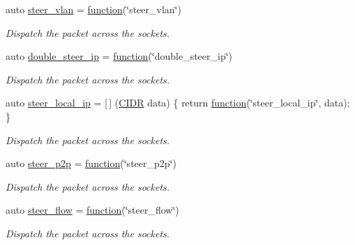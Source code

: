 \begin{DoxyCompactItemize}
auto \hyperlink{namespacepfq_1_1lang_1_1anonymous__namespace_02default_8hpp_03_a2c6a8ad5a3ae8b60a6a3d18a510f22ac}{steer\+\_\+vlan} = \hyperlink{namespacepfq_1_1lang_a1a4638059d700ae08d0ca63886ff2bb3}{function}(\char`\"{}steer\+\_\+vlan\char`\"{})
\begin{DoxyCompactList}\small\item\em Dispatch the packet across the sockets. \end{DoxyCompactList}\item 
auto \hyperlink{namespacepfq_1_1lang_1_1anonymous__namespace_02default_8hpp_03_aaea5fb1d1914a1b01e52d8634b095eb6}{double\+\_\+steer\+\_\+ip} = \hyperlink{namespacepfq_1_1lang_a1a4638059d700ae08d0ca63886ff2bb3}{function}(\char`\"{}double\+\_\+steer\+\_\+ip\char`\"{})
\begin{DoxyCompactList}\small\item\em Dispatch the packet across the sockets. \end{DoxyCompactList}\item 
auto \hyperlink{namespacepfq_1_1lang_1_1anonymous__namespace_02default_8hpp_03_a4f2ef4dd2da0408a456f9b29b752686a}{steer\+\_\+local\+\_\+ip} = \mbox{[}$\,$\mbox{]} (\hyperlink{structpfq_1_1lang_1_1CIDR}{C\+I\+DR} data) \{ return \hyperlink{namespacepfq_1_1lang_a1a4638059d700ae08d0ca63886ff2bb3}{function}(\char`\"{}steer\+\_\+local\+\_\+ip\char`\"{}, data); \}
\begin{DoxyCompactList}\small\item\em Dispatch the packet across the sockets. \end{DoxyCompactList}\item 
auto \hyperlink{namespacepfq_1_1lang_1_1anonymous__namespace_02default_8hpp_03_a93e5f91a2b955269de017225cf62e711}{steer\+\_\+p2p} = \hyperlink{namespacepfq_1_1lang_a1a4638059d700ae08d0ca63886ff2bb3}{function}(\char`\"{}steer\+\_\+p2p\char`\"{})
\begin{DoxyCompactList}\small\item\em Dispatch the packet across the sockets. \end{DoxyCompactList}\item 
auto \hyperlink{namespacepfq_1_1lang_1_1anonymous__namespace_02default_8hpp_03_adeb44c976ac903e7b13addb65ac41f9f}{steer\+\_\+flow} = \hyperlink{namespacepfq_1_1lang_a1a4638059d700ae08d0ca63886ff2bb3}{function}(\char`\"{}steer\+\_\+flow\char`\"{})
\begin{DoxyCompactList}\small\item\em Dispatch the packet across the sockets. \end{DoxyCompactList}\item 

\end{DoxyCompactItemize}
